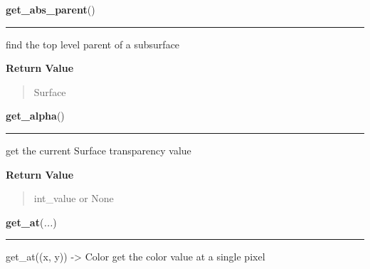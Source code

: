 \hspace{.8\funcindent}\begin{boxedminipage}{\funcwidth}

    \raggedright \textbf{get\_abs\_parent}()

    \vspace{-1.5ex}

    \rule{\textwidth}{0.5\fboxrule}
\setlength{\parskip}{2ex}
    find the top level parent of a subsurface

\setlength{\parskip}{1ex}
      \textbf{Return Value}
    \vspace{-1ex}

      \begin{quote}
      Surface

      \end{quote}

    \end{boxedminipage}

    \label{pygame:Surface:get_alpha}

    \vspace{0.5ex}

\hspace{.8\funcindent}\begin{boxedminipage}{\funcwidth}

    \raggedright \textbf{get\_alpha}()

    \vspace{-1.5ex}

    \rule{\textwidth}{0.5\fboxrule}
\setlength{\parskip}{2ex}
    get the current Surface transparency value

\setlength{\parskip}{1ex}
      \textbf{Return Value}
    \vspace{-1ex}

      \begin{quote}
      int\_value or None

      \end{quote}

    \end{boxedminipage}

    \label{pygame:Surface:get_at}

    \vspace{0.5ex}

\hspace{.8\funcindent}\begin{boxedminipage}{\funcwidth}

    \raggedright \textbf{get\_at}(\textit{...})

    \vspace{-1.5ex}

    \rule{\textwidth}{0.5\fboxrule}
\setlength{\parskip}{2ex}
    get\_at((x, y)) -{\textgreater} Color get the color value at a single 
    pixel

\setlength{\parskip}{1ex}
    \end{boxedminipage}


